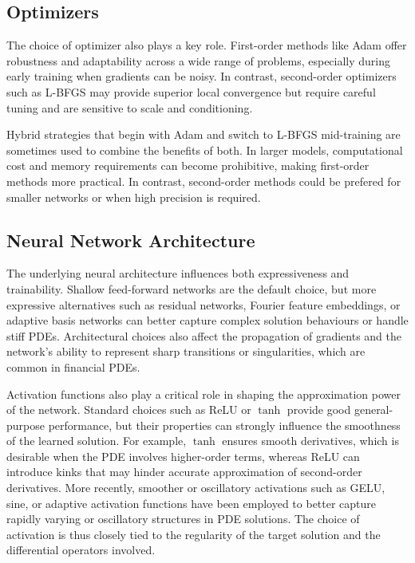 \documentclass[12pt]{report} %
\theoremstyle{plain} %
\theoremstyle{definition} %
\theoremstyle{remark} %
\begin{document}
\subsection{Optimizers}

The choice of optimizer also plays a key role. First-order methods like Adam offer robustness and adaptability across 
a wide range of problems, especially during early training when gradients can be noisy. In contrast, second-order 
optimizers such as L-BFGS may provide superior local convergence but require careful tuning and are sensitive to 
scale and conditioning. 

Hybrid strategies that begin with Adam and switch to L-BFGS mid-training are sometimes used 
to combine the benefits of both. In larger models, computational cost and memory requirements can become prohibitive,
making first-order methods more practical. In contrast, second-order methods could be prefered for smaller networks or when
high precision is required.

\subsection{Neural Network Architecture}

The underlying neural architecture influences both expressiveness and trainability. 
Shallow feed-forward networks are the default choice, but more expressive alternatives such as residual networks, Fourier feature embeddings, or adaptive 
basis networks can better capture complex solution behaviours or handle stiff PDEs. Architectural choices also affect 
the propagation of gradients and the network's ability to represent sharp transitions or singularities, which are common in financial PDEs.

Activation functions also play a critical role in shaping the approximation power of the network. 
Standard choices such as ReLU or $\tanh$ provide good general-purpose performance, but their properties can strongly influence the smoothness of the learned solution. 
For example, $\tanh$ ensures smooth derivatives, which is desirable when the PDE involves higher-order terms, whereas ReLU can introduce kinks that may hinder accurate 
approximation of second-order derivatives. More recently, smoother or oscillatory activations such as GELU, sine, or adaptive activation functions 
have been employed to better capture rapidly varying or oscillatory structures in PDE solutions. 
The choice of activation is thus closely tied to the regularity of the target solution and the differential operators involved.
\end{document}
